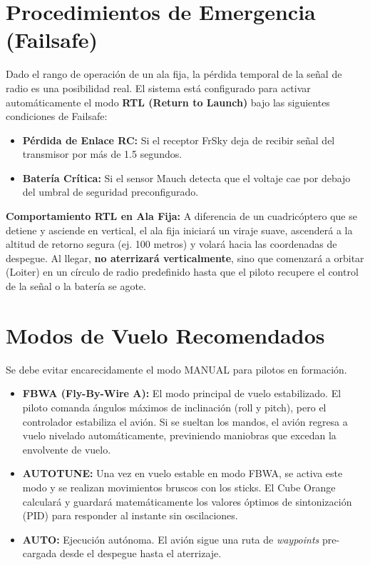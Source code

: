 \documentclass[11pt,a4paper]{article}
\begin{document}
\section{Procedimientos de Emergencia (Failsafe)}
Dado el rango de operación de un ala fija, la pérdida temporal de la señal de radio es una posibilidad real. El sistema está configurado para activar automáticamente el modo \textbf{RTL (Return to Launch)} bajo las siguientes condiciones de Failsafe:
\begin{itemize}[itemsep=1ex]
    \item \textbf{Pérdida de Enlace RC:} Si el receptor FrSky deja de recibir señal del transmisor por más de 1.5 segundos.
    \item \textbf{Batería Crítica:} Si el sensor Mauch detecta que el voltaje cae por debajo del umbral de seguridad preconfigurado.
\end{itemize}
\textbf{Comportamiento RTL en Ala Fija:} A diferencia de un cuadricóptero que se detiene y asciende en vertical, el ala fija iniciará un viraje suave, ascenderá a la altitud de retorno segura (ej. 100 metros) y volará hacia las coordenadas de despegue. Al llegar, \textbf{no aterrizará verticalmente}, sino que comenzará a orbitar (Loiter) en un círculo de radio predefinido hasta que el piloto recupere el control de la señal o la batería se agote.

\section{Modos de Vuelo Recomendados}
Se debe evitar encarecidamente el modo MANUAL para pilotos en formación.
\begin{itemize}[itemsep=1ex]
    \item \textbf{FBWA (Fly-By-Wire A):} El modo principal de vuelo estabilizado. El piloto comanda ángulos máximos de inclinación (roll y pitch), pero el controlador estabiliza el avión. Si se sueltan los mandos, el avión regresa a vuelo nivelado automáticamente, previniendo maniobras que excedan la envolvente de vuelo.
    \item \textbf{AUTOTUNE:} Una vez en vuelo estable en modo FBWA, se activa este modo y se realizan movimientos bruscos con los sticks. El Cube Orange calculará y guardará matemáticamente los valores óptimos de sintonización (PID) para responder al instante sin oscilaciones.
    \item \textbf{AUTO:} Ejecución autónoma. El avión sigue una ruta de \textit{waypoints} pre-cargada desde el despegue hasta el aterrizaje.
\end{itemize}
\end{document}
